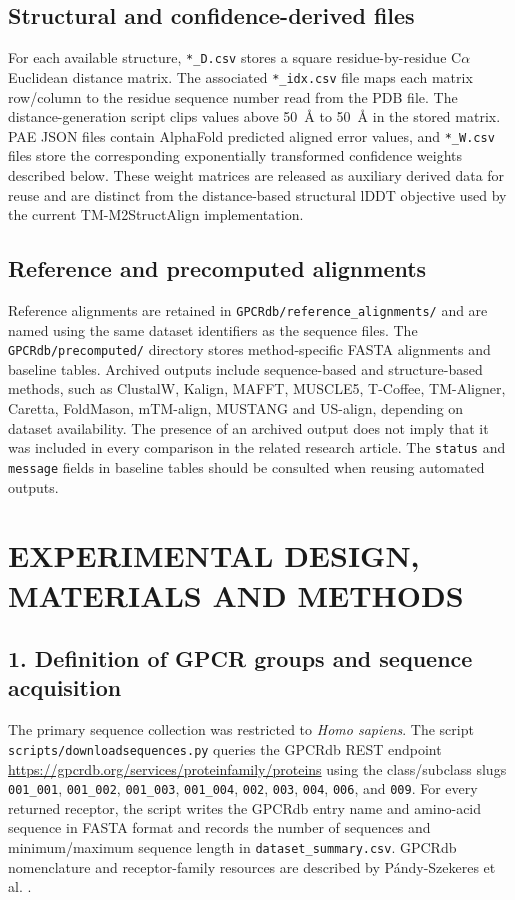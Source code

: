 \documentclass[a4paper,12pt]{article}
\begin{document}
	\subsection*{Structural and confidence-derived files}
	For each available structure, \texttt{*\_D.csv} stores a square residue-by-residue C$\alpha$ Euclidean distance matrix. The associated \texttt{*\_idx.csv} file maps each matrix row/column to the residue sequence number read from the PDB file. The distance-generation script clips values above 50~\AA{} to 50~\AA{} in the stored matrix. PAE JSON files contain AlphaFold predicted aligned error values, and \texttt{*\_W.csv} files store the corresponding exponentially transformed confidence weights described below. These weight matrices are released as auxiliary derived data for reuse and are distinct from the distance-based structural lDDT objective used by the current TM-M2StructAlign implementation.
	
	\subsection*{Reference and precomputed alignments}
	Reference alignments are retained in \texttt{GPCRdb/reference\_alignments/} and are named using the same dataset identifiers as the sequence files. The \texttt{GPCRdb/precomputed/} directory stores method-specific FASTA alignments and baseline tables. Archived outputs include sequence-based and structure-based methods, such as ClustalW, Kalign, MAFFT, MUSCLE5, T-Coffee, TM-Aligner, Caretta, FoldMason, mTM-align, MUSTANG and US-align, depending on dataset availability. The presence of an archived output does not imply that it was included in every comparison in the related research article. The \texttt{status} and \texttt{message} fields in baseline tables should be consulted when reusing automated outputs.
	
	\section*{EXPERIMENTAL DESIGN, MATERIALS AND METHODS}
	
	\subsection*{1. Definition of GPCR groups and sequence acquisition}
	The primary sequence collection was restricted to \textit{Homo sapiens}. The script \texttt{scripts/downloadsequences.py} queries the GPCRdb REST endpoint \url{https://gpcrdb.org/services/proteinfamily/proteins} using the class/subclass slugs \texttt{001\_001}, \texttt{001\_002}, \texttt{001\_003}, \texttt{001\_004}, \texttt{002}, \texttt{003}, \texttt{004}, \texttt{006}, and \texttt{009}. For every returned receptor, the script writes the GPCRdb entry name and amino-acid sequence in FASTA format and records the number of sequences and minimum/maximum sequence length in \texttt{dataset\_summary.csv}. GPCRdb nomenclature and receptor-family resources are described by P\'andy-Szekeres et al. \cite{pandyszekeres2023gpcrdb}.
	
\end{document}
